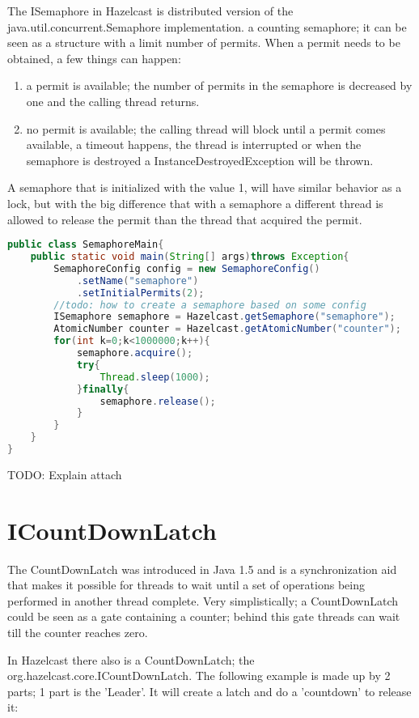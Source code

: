 The ISemaphore in Hazelcast is distributed version of the java.util.concurrent.Semaphore
implementation. a counting semaphore; it can be seen as a structure with 
a limit number of permits. When a permit needs to be obtained, a few things can happen:
\begin{enumerate}
\item a permit is available; the number of permits in the semaphore is decreased by one 
and the calling thread returns.
\item no permit is available; the calling thread will block until a permit comes available,
a timeout happens, the thread is interrupted or when the semaphore is destroyed a InstanceDestroyedException
will be thrown.
\end{enumerate}

A semaphore that is initialized with the value 1, will have similar behavior as a lock,
but with the big difference that with a semaphore a different thread is allowed to release
the permit than the thread that acquired the permit.

\begin{lstlisting}[language=java]
public class SemaphoreMain{
    public static void main(String[] args)throws Exception{
        SemaphoreConfig config = new SemaphoreConfig()
            .setName("semaphore")
            .setInitialPermits(2);
        //todo: how to create a semaphore based on some config
        ISemaphore semaphore = Hazelcast.getSemaphore("semaphore");
        AtomicNumber counter = Hazelcast.getAtomicNumber("counter");
        for(int k=0;k<1000000;k++){
            semaphore.acquire();
            try{
                Thread.sleep(1000);
            }finally{
                semaphore.release();
            }
        }
    }
}
\end{lstlisting}

TODO: Explain attach

\section{ICountDownLatch}
The CountDownLatch was introduced in Java 1.5 and is a synchronization aid that makes it
possible for threads to wait until a set of operations being performed in another thread 
complete. Very simplistically; a CountDownLatch could be seen as a gate containing a counter;
behind this gate threads can wait till the counter reaches zero. 

In Hazelcast there also is a CountDownLatch; the org.hazelcast.core.ICountDownLatch. 
The following example is made up by 2 parts; 1 part is the 'Leader'. It will create a latch
and do a 'countdown' to release it:

